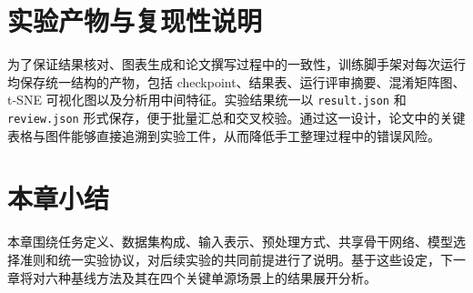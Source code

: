 \section{实验产物与复现性说明}
为了保证结果核对、图表生成和论文撰写过程中的一致性，训练脚手架对每次运行均保存统一结构的产物，包括 checkpoint、结果表、运行评审摘要、混淆矩阵图、t-SNE 可视化图以及分析用中间特征。实验结果统一以 \texttt{result.json} 和 \texttt{review.json} 形式保存，便于批量汇总和交叉校验。通过这一设计，论文中的关键表格与图件能够直接追溯到实验工件，从而降低手工整理过程中的错误风险。

\section{本章小结}
本章围绕任务定义、数据集构成、输入表示、预处理方式、共享骨干网络、模型选择准则和统一实验协议，对后续实验的共同前提进行了说明。基于这些设定，下一章将对六种基线方法及其在四个关键单源场景上的结果展开分析。
